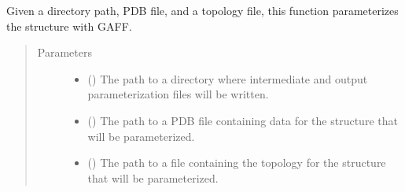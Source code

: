 \documentclass[letterpaper,12pt,english,openany,oneside]{sphinxmanual}
\begin{document}
\begin{fulllineitems}
\label{\detokenize{simulation:simulation.parameterize}}
Given a directory path, PDB file, and a topology file, this function parameterizes the structure with GAFF.
\begin{quote}\begin{description}
\item[{Parameters}] \leavevmode\begin{itemize}
\item {} 
 () \textendash{} The path to a directory where intermediate and output parameterization files will be written.

\item {} 
 () \textendash{} The path to a PDB file containing data for the structure that will be parameterized.

\item {} 
 () \textendash{} The path to a file containing the topology for the structure that will be parameterized.

\end{itemize}

\end{description}\end{quote}

\end{fulllineitems}

\end{document}
